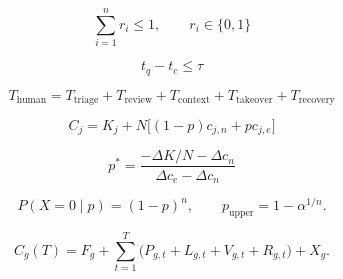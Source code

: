 
\[
\sum_{i=1}^{n} r_i \leq 1,\qquad r_i \in \{0,1\}
\]

\[
t_q-t_c \leq \tau
\]

\[
T_{\mathrm{human}} = T_{\mathrm{triage}} + T_{\mathrm{review}} + T_{\mathrm{context}} + T_{\mathrm{takeover}} + T_{\mathrm{recovery}}
\]

\[
C_j = K_j + N\bigl[(1-p)c_{j,n}+p c_{j,e}\bigr]
\]

\[
p^{*}=\frac{-\Delta K/N-\Delta c_n}{\Delta c_e-\Delta c_n}
\]

\[
P(X=0\mid p)=(1-p)^n,\qquad p_{\mathrm{upper}}=1-\alpha^{1/n}.
\]

\[
C_g(T)=F_g+\sum_{t=1}^{T}\bigl(P_{g,t}+L_{g,t}+V_{g,t}+R_{g,t}\bigr)+X_g.
\]